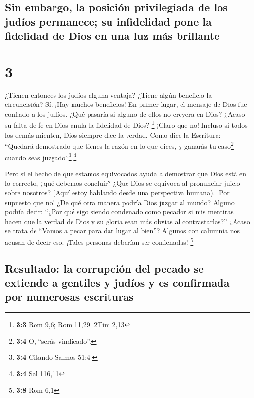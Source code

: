 \hypertarget{sin-embargo-la-posiciuxf3n-privilegiada-de-los-juduxedos-permanece-su-infidelidad-pone-la-fidelidad-de-dios-en-una-luz-muxe1s-brillante}{%
\subsection{Sin embargo, la posición privilegiada de los judíos
permanece; su infidelidad pone la fidelidad de Dios en una luz más
brillante}\label{sin-embargo-la-posiciuxf3n-privilegiada-de-los-juduxedos-permanece-su-infidelidad-pone-la-fidelidad-de-dios-en-una-luz-muxe1s-brillante}}

\hypertarget{section-2}{%
\section{3}\label{section-2}}

 ¿Tienen entonces los judíos alguna ventaja? ¿Tiene algún
beneficio la circuncisión?  Sí. ¡Hay muchos beneficios! En
primer lugar, el mensaje de Dios fue confiado a los judíos.
 ¿Qué pasaría si alguno de ellos no creyera en Dios?
¿Acaso su falta de fe en Dios anula la fidelidad de Dios? \footnote{\textbf{3:3}
  Rom 9,6; Rom 11,29; 2Tim 2,13}  ¡Claro que no! Incluso
si todos los demás mienten, Dios siempre dice la verdad. Como dice la
Escritura: ``Quedará demostrado que tienes la razón en lo que dices, y
ganarás tu caso\footnote{\textbf{3:4} O, ``serás vindicado''.} cuando
seas juzgado''\footnote{\textbf{3:4} Citando Salmos 51:4.} \footnote{\textbf{3:4}
  Sal 116,11}

 Pero si el hecho de que estamos equivocados ayuda a
demostrar que Dios está en lo correcto, ¿qué debemos concluir? ¿Que Dios
se equivoca al pronunciar juicio sobre nosotros? (Aquí estoy hablando
desde una perspectiva humana).  ¡Por supuesto que no! ¿De
qué otra manera podría Dios juzgar al mundo?  Alguno
podría decir: ``¿Por qué sigo siendo condenado como pecador si mis
mentiras hacen que la verdad de Dios y su gloria sean más obvias al
contrastarlas?''  ¿Acaso se trata de ``Vamos a pecar para
dar lugar al bien''? Algunos con calumnia nos acusan de decir eso.
¡Tales personas deberían ser condenadas! \footnote{\textbf{3:8} Rom 6,1}

\hypertarget{resultado-la-corrupciuxf3n-del-pecado-se-extiende-a-gentiles-y-juduxedos-y-es-confirmada-por-numerosas-escrituras}{%
\subsection{Resultado: la corrupción del pecado se extiende a gentiles y
judíos y es confirmada por numerosas
escrituras}\label{resultado-la-corrupciuxf3n-del-pecado-se-extiende-a-gentiles-y-juduxedos-y-es-confirmada-por-numerosas-escrituras}}

